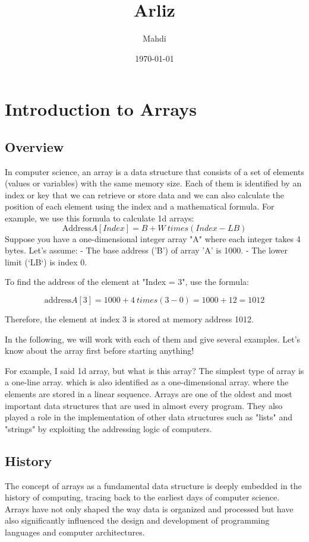\documentclass{book}
\title{{\Huge Arliz}}
\author{{\LARGE Mahdi}}
\date{{\large \today}}
\begin{document}
	
	\maketitle
	\tableofcontents
	
	\chapter{Introduction to Arrays}
	
	\section{Overview}
In computer science, an array is a data structure that consists of a set of elements (values ​​or variables) with the same memory size. Each of them is identified by an index or key that we can retrieve or store data and we can also calculate the position of each element using the index and a mathematical formula.
For example, we use this formula to calculate 1d arrays:
\[\text{Address} A[Index] = B + W \ times (Index - LB)\]
Suppose you have a one-dimensional integer array "A" where each integer takes 4 bytes. Let's assume:
- The base address ('B') of array 'A' is 1000.
- The lower limit (`LB`) is index 0.

To find the address of the element at "Index = 3", use the formula:

\[\text{address} A[3] = 1000 + 4 \ times (3 - 0) = 1000 + 12 = 1012\]

Therefore, the element at index 3 is stored at memory address 1012.

In the following, we will work with each of them and give several examples. Let's know about the array first before starting anything!

For example, I said 1d array, but what is this array?
The simplest type of array is a one-line array. which is also identified as a one-dimensional array. where the elements are stored in a linear sequence. Arrays are one of the oldest and most important data structures that are used in almost every program. They also played a role in the implementation of other data structures such as "lists" and "strings" by exploiting the addressing logic of computers.
	\section{History}
	
	The concept of arrays as a fundamental data structure is deeply embedded in the history of computing, tracing back to the earliest days of computer science. Arrays have not only shaped the way data is organized and processed but have also significantly influenced the design and development of programming languages and computer architectures.
	
\end{document}
